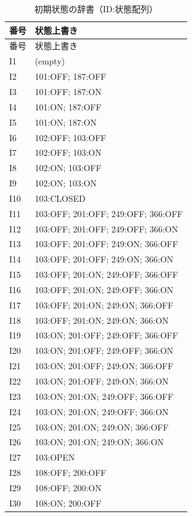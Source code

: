 {\scriptsize\setlength{\tabcolsep}{3pt}
\begin{longtable}{lp{.85\linewidth}}
\caption{初期状態の辞書（ID:状態配列）}\label{tab:initial_state_dictionary}\\
\hline
番号 & 状態上書き\\\hline\endfirsthead
番号 & 状態上書き\\\hline\endhead
\hline\endfoot
I1 & (empty) \\
I2 & 101:OFF; 187:OFF \\
I3 & 101:OFF; 187:ON \\
I4 & 101:ON; 187:OFF \\
I5 & 101:ON; 187:ON \\
I6 & 102:OFF; 103:OFF \\
I7 & 102:OFF; 103:ON \\
I8 & 102:ON; 103:OFF \\
I9 & 102:ON; 103:ON \\
I10 & 103:CLOSED \\
I11 & 103:OFF; 201:OFF; 249:OFF; 366:OFF \\
I12 & 103:OFF; 201:OFF; 249:OFF; 366:ON \\
I13 & 103:OFF; 201:OFF; 249:ON; 366:OFF \\
I14 & 103:OFF; 201:OFF; 249:ON; 366:ON \\
I15 & 103:OFF; 201:ON; 249:OFF; 366:OFF \\
I16 & 103:OFF; 201:ON; 249:OFF; 366:ON \\
I17 & 103:OFF; 201:ON; 249:ON; 366:OFF \\
I18 & 103:OFF; 201:ON; 249:ON; 366:ON \\
I19 & 103:ON; 201:OFF; 249:OFF; 366:OFF \\
I20 & 103:ON; 201:OFF; 249:OFF; 366:ON \\
I21 & 103:ON; 201:OFF; 249:ON; 366:OFF \\
I22 & 103:ON; 201:OFF; 249:ON; 366:ON \\
I23 & 103:ON; 201:ON; 249:OFF; 366:OFF \\
I24 & 103:ON; 201:ON; 249:OFF; 366:ON \\
I25 & 103:ON; 201:ON; 249:ON; 366:OFF \\
I26 & 103:ON; 201:ON; 249:ON; 366:ON \\
I27 & 103:OPEN \\
I28 & 108:OFF; 200:OFF \\
I29 & 108:OFF; 200:ON \\
I30 & 108:ON; 200:OFF \\

\end{longtable}}
